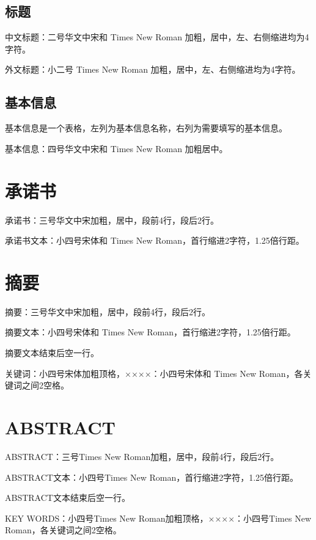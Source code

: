 \subsection{标题}
\par 中文标题：二号华文中宋和 Times New Roman 加粗，居中，左、右侧缩进均为4字符。
\par 外文标题：小二号 Times New Roman 加粗，居中，左、右侧缩进均为4字符。

\subsection{基本信息}
\par 基本信息是一个表格，左列为基本信息名称，右列为需要填写的基本信息。
\par 基本信息：四号华文中宋和 Times New Roman 加粗居中。

\section{承诺书}
\par 承诺书：三号华文中宋加粗，居中，段前4行，段后2行。
\par 承诺书文本：小四号宋体和 Times New Roman，首行缩进2字符，1.25倍行距。

\section{摘要}
\par 摘要：三号华文中宋加粗，居中，段前4行，段后2行。
\par 摘要文本：小四号宋体和 Times New Roman，首行缩进2字符，1.25倍行距。
\par 摘要文本结束后空一行。
\par 关键词：小四号宋体加粗顶格，××××：小四号宋体和 Times New Roman，各关键词之间2空格。

\section{ABSTRACT}
\par ABSTRACT：三号Times New Roman加粗，居中，段前4行，段后2行。
\par ABSTRACT文本：小四号Times New Roman，首行缩进2字符，1.25倍行距。
\par ABSTRACT文本结束后空一行。
\par KEY WORDS：小四号Times New Roman加粗顶格，××××：小四号Times New Roman，各关键词之间2空格。

